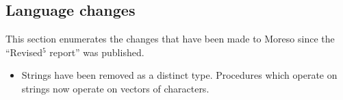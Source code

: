 


\subsection*{Language changes}
\label{differences}

This section enumerates the changes that have been made to Moreso since
the ``Revised$^5$ report'' was published.

\begin{itemize}

\item Strings have been removed as a distinct type.  Procedures which
operate on strings now operate on vectors of characters.

\end{itemize}

